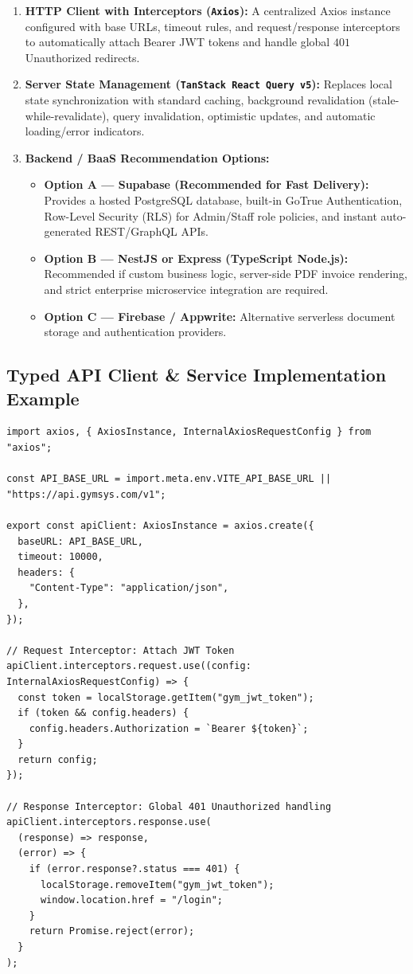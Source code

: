 \documentclass[11pt,a4paper]{article}
\begin{document}
\begin{enumerate}[leftmargin=*, itemsep=6pt]
  \item \textbf{HTTP Client with Interceptors (\texttt{Axios}):}
  A centralized Axios instance configured with base URLs, timeout rules, and request/response interceptors to automatically attach Bearer JWT tokens and handle global $401$ Unauthorized redirects.

  \item \textbf{Server State Management (\texttt{TanStack React Query v5}):}
  Replaces local state synchronization with standard caching, background revalidation (stale-while-revalidate), query invalidation, optimistic updates, and automatic loading/error indicators.

  \item \textbf{Backend / BaaS Recommendation Options:}
  \begin{itemize}
    \item \textbf{Option A --- Supabase (Recommended for Fast Delivery):} Provides a hosted PostgreSQL database, built-in GoTrue Authentication, Row-Level Security (RLS) for Admin/Staff role policies, and instant auto-generated REST/GraphQL APIs.
    \item \textbf{Option B --- NestJS or Express (TypeScript Node.js):} Recommended if custom business logic, server-side PDF invoice rendering, and strict enterprise microservice integration are required.
    \item \textbf{Option C --- Firebase / Appwrite:} Alternative serverless document storage and authentication providers.
  \end{itemize}
\end{enumerate}

\newpage
\subsection{Typed API Client \& Service Implementation Example}

\begin{lstlisting}[caption={services/apiClient.ts (Axios Client with JWT Interceptors)}]
import axios, { AxiosInstance, InternalAxiosRequestConfig } from "axios";

const API_BASE_URL = import.meta.env.VITE_API_BASE_URL || "https://api.gymsys.com/v1";

export const apiClient: AxiosInstance = axios.create({
  baseURL: API_BASE_URL,
  timeout: 10000,
  headers: {
    "Content-Type": "application/json",
  },
});

// Request Interceptor: Attach JWT Token
apiClient.interceptors.request.use((config: InternalAxiosRequestConfig) => {
  const token = localStorage.getItem("gym_jwt_token");
  if (token && config.headers) {
    config.headers.Authorization = `Bearer ${token}`;
  }
  return config;
});

// Response Interceptor: Global 401 Unauthorized handling
apiClient.interceptors.response.use(
  (response) => response,
  (error) => {
    if (error.response?.status === 401) {
      localStorage.removeItem("gym_jwt_token");
      window.location.href = "/login";
    }
    return Promise.reject(error);
  }
);
\end{lstlisting}
\end{document}
